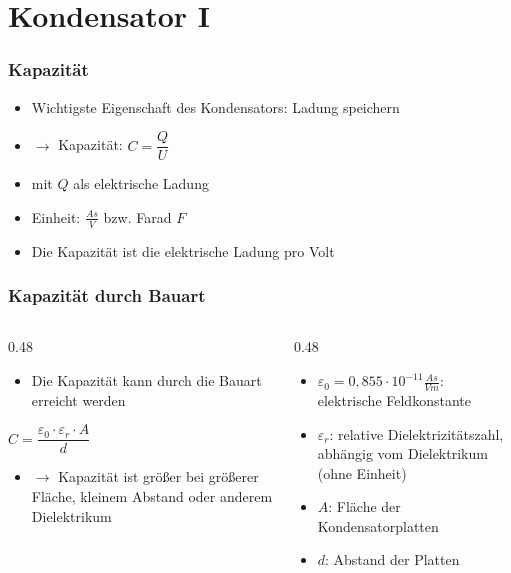 
\section{Kondensator I}
\label{section:kondensator_1}
\begin{frame}%
    \frametitle{Kapazität}
    \begin{itemize}
        \item Wichtigste Eigenschaft des Kondensators: Ladung speichern
        \item $\rightarrow$ Kapazität: $C = \dfrac{Q}{U}$
        \item mit $Q$ als elektrische Ladung
        \item Einheit: $\frac{As}{V}$ bzw. Farad $F$
        \item Die Kapazität ist die elektrische Ladung pro Volt
    \end{itemize}
\end{frame}

\begin{frame}
\frametitle{Kapazität durch Bauart}
\begin{columns}
    \begin{column}{0.48\textwidth}
    \begin{itemize}
  \item Die Kapazität kann durch die Bauart erreicht werden
  \end{itemize}
$C = \dfrac{\varepsilon_0 \cdot \varepsilon_r \cdot A}{d}$

\begin{itemize}
  \item $\rightarrow$ Kapazität ist größer bei größerer Fläche, kleinem Abstand oder anderem Dielektrikum
  \end{itemize}

    \end{column}
   \begin{column}{0.48\textwidth}
       \begin{itemize}
  \item $\varepsilon_0 = 0,855 \cdot 10^{-11}\frac{As}{Vm}$: elektrische Feldkonstante
  \item $\varepsilon_r$: relative Dielektrizitätszahl, abhängig vom Dielektrikum (ohne Einheit)
  \item $A$: Fläche der Kondensatorplatten
  \item $d$: Abstand der Platten
  \end{itemize}

   \end{column}
\end{columns}

\end{frame}

